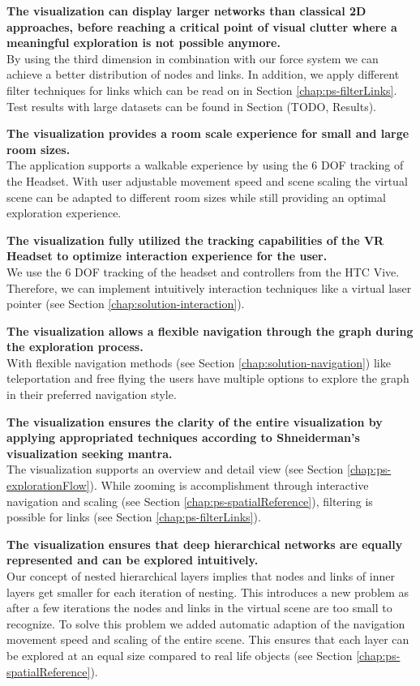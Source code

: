 \textbf{The visualization can display larger networks than classical 2D approaches, before reaching a critical point of visual clutter where a meaningful exploration is not possible anymore.}\\
By using the third dimension in combination with our force system we can achieve a better distribution of nodes and links. In addition, we apply different filter techniques for links which can be read on in Section \ref{chap:ps-filterLinks}. Test results with large datasets can be found in Section (TODO, Results).

\textbf{The visualization provides a room scale experience for small and large room sizes.}\\
The application supports a walkable experience by using the 6 DOF tracking of the Headset. 
With user adjustable movement speed and scene scaling the virtual scene can be adapted to different room sizes while still providing an optimal exploration experience. 

\textbf{The visualization fully utilized the tracking capabilities of the VR Headset to optimize interaction experience for the user.}\\
We use the 6 DOF tracking of the headset and controllers from the HTC Vive. Therefore, we can implement intuitively interaction techniques like a virtual laser pointer (see Section \ref{chap:solution-interaction}).

\textbf{The visualization allows a flexible navigation through the graph during the exploration process.}\\
With flexible navigation methods (see Section \ref{chap:solution-navigation}) like teleportation and free flying the users have multiple options to explore the graph in their preferred navigation style.

\textbf{The visualization ensures the clarity of the entire visualization by applying appropriated techniques according to Shneiderman's visualization seeking mantra.}\\
The visualization supports an overview and detail view (see Section \ref{chap:ps-explorationFlow}). While zooming is accomplishment through interactive navigation and scaling (see Section \ref{chap:ps-spatialReference}), filtering is possible for links (see Section \ref{chap:ps-filterLinks}).

\textbf{The visualization ensures that deep hierarchical networks are equally represented and can be explored intuitively.}\\
Our concept of nested hierarchical layers implies that nodes and links of inner layers get smaller for each iteration of nesting. This introduces a new problem as after a few iterations the nodes and links in the virtual scene are too small to recognize.
To solve this problem we added automatic adaption of the navigation movement speed and scaling of the entire scene. This ensures that each layer can be explored at an equal size compared to real life objects (see Section \ref{chap:ps-spatialReference}).

